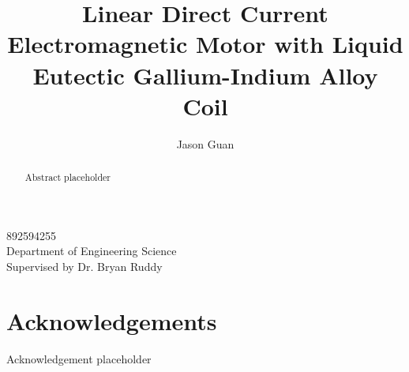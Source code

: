 \documentclass[a4paper,12pt]{article}
\title{Linear Direct Current Electromagnetic Motor with Liquid Eutectic Gallium-Indium Alloy Coil}
\author{Jason Guan}
\begin{document}
\maketitle
\begin{center}
    892594255\\
    Department of Engineering Science\\
    Supervised by Dr. Bryan Ruddy
\end{center}

\newpage

\begin{abstract}
Abstract placeholder
\end{abstract}

\newpage

\section*{Acknowledgements}
Acknowledgement placeholder

\newpage

\tableofcontents

\newpage
\end{document}
